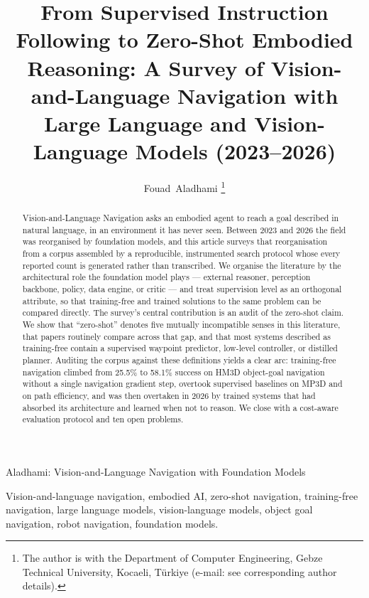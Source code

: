 \documentclass[journal]{IEEEtran}
\begin{document}
\title{From Supervised Instruction Following to Zero-Shot Embodied
Reasoning: A Survey of Vision-and-Language Navigation with Large Language
and Vision-Language Models (2023--2026)}

\author{Fouad~Aladhami%
\thanks{The author is with the Department of Computer Engineering,
Gebze Technical University, Kocaeli, T\"urkiye
(e-mail: see corresponding author details).}}

%
{Aladhami: Vision-and-Language Navigation with Foundation Models}

\maketitle

\begin{abstract}
Vision-and-Language Navigation asks an embodied agent to reach a goal
described in natural language, in an environment it has never seen. Between
2023 and 2026 the field was reorganised by foundation models, and this
article surveys that reorganisation from a corpus assembled by a
reproducible, instrumented search protocol whose every reported count is
generated rather than transcribed. We organise the literature by the
architectural role the foundation model plays --- external reasoner,
perception backbone, policy, data engine, or critic --- and treat
supervision level as an orthogonal attribute, so that training-free and
trained solutions to the same problem can be compared directly. The
survey's central contribution is an audit of the zero-shot claim. We show
that ``zero-shot'' denotes five mutually incompatible senses in this
literature, that papers routinely compare across that gap, and that most
systems described as training-free contain a supervised waypoint predictor,
low-level controller, or distilled planner. Auditing the corpus against
these definitions yields a clear arc: training-free navigation climbed from
25.5\% to 58.1\% success on HM3D object-goal navigation without a single
navigation gradient step, overtook supervised baselines on MP3D and on path
efficiency, and was then overtaken in 2026 by trained systems that had
absorbed its architecture and learned when not to reason. We close with a
cost-aware evaluation protocol and ten open problems.
\end{abstract}

\begin{IEEEkeywords}
Vision-and-language navigation, embodied AI, zero-shot navigation,
training-free navigation, large language models, vision-language models,
object goal navigation, robot navigation, foundation models.
\end{IEEEkeywords}
\end{document}
